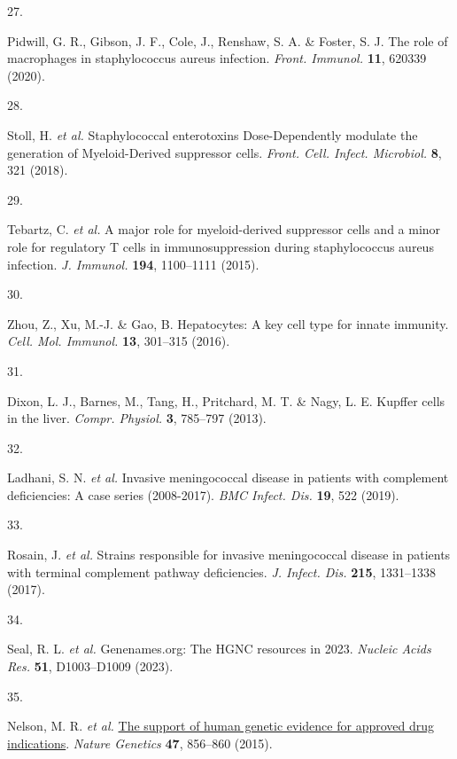 \documentclass[
]{article}
\newlength{\cslhangindent}
\newlength{\csllabelwidth}
\newenvironment{CSLReferences}[2] %
 {\begin{list}{}{%
  \setlength{\itemindent}{0pt}
  \setlength{\leftmargin}{0pt}
  \setlength{\parsep}{0pt}
  \ifodd #1
   \setlength{\leftmargin}{\cslhangindent}
   \setlength{\itemindent}{-1\cslhangindent}
  \fi
  \setlength{\itemsep}{#2\baselineskip}}}
 {\end{list}}
\newcommand{\CSLLeftMargin}[1]{\parbox[t]{\csllabelwidth}{\strut#1\strut}}
\newcommand{\CSLRightInline}[1]{\parbox[t]{\linewidth - \csllabelwidth}{\strut#1\strut}}
\begin{document}
\begin{CSLReferences}{0}{0}
\CSLLeftMargin{27. }%
\CSLRightInline{Pidwill, G. R., Gibson, J. F., Cole, J., Renshaw, S. A.
\& Foster, S. J. The role of macrophages in staphylococcus aureus
infection. \emph{Front. Immunol.} \textbf{11}, 620339 (2020).}

\CSLLeftMargin{28. }%
\CSLRightInline{Stoll, H. \emph{et al.} Staphylococcal enterotoxins
{Dose-Dependently} modulate the generation of {Myeloid-Derived}
suppressor cells. \emph{Front. Cell. Infect. Microbiol.} \textbf{8}, 321
(2018).}

\CSLLeftMargin{29. }%
\CSLRightInline{Tebartz, C. \emph{et al.} A major role for
myeloid-derived suppressor cells and a minor role for regulatory {T}
cells in immunosuppression during staphylococcus aureus infection.
\emph{J. Immunol.} \textbf{194}, 1100--1111 (2015).}

\CSLLeftMargin{30. }%
\CSLRightInline{Zhou, Z., Xu, M.-J. \& Gao, B. Hepatocytes: A key cell
type for innate immunity. \emph{Cell. Mol. Immunol.} \textbf{13},
301--315 (2016).}

\CSLLeftMargin{31. }%
\CSLRightInline{Dixon, L. J., Barnes, M., Tang, H., Pritchard, M. T. \&
Nagy, L. E. Kupffer cells in the liver. \emph{Compr. Physiol.}
\textbf{3}, 785--797 (2013).}

\CSLLeftMargin{32. }%
\CSLRightInline{Ladhani, S. N. \emph{et al.} Invasive meningococcal
disease in patients with complement deficiencies: A case series
(2008-2017). \emph{BMC Infect. Dis.} \textbf{19}, 522 (2019).}

\CSLLeftMargin{33. }%
\CSLRightInline{Rosain, J. \emph{et al.} Strains responsible for
invasive meningococcal disease in patients with terminal complement
pathway deficiencies. \emph{J. Infect. Dis.} \textbf{215}, 1331--1338
(2017).}

\CSLLeftMargin{34. }%
\CSLRightInline{Seal, R. L. \emph{et al.} Genenames.org: The {HGNC}
resources in 2023. \emph{Nucleic Acids Res.} \textbf{51}, D1003--D1009
(2023).}

\CSLLeftMargin{35. }%
\CSLRightInline{Nelson, M. R. \emph{et al.}
\href{https://doi.org/10.1038/ng.3314}{The support of human genetic
evidence for approved drug indications}. \emph{Nature Genetics}
\textbf{47}, 856--860 (2015).}


\end{CSLReferences}
\end{document}
